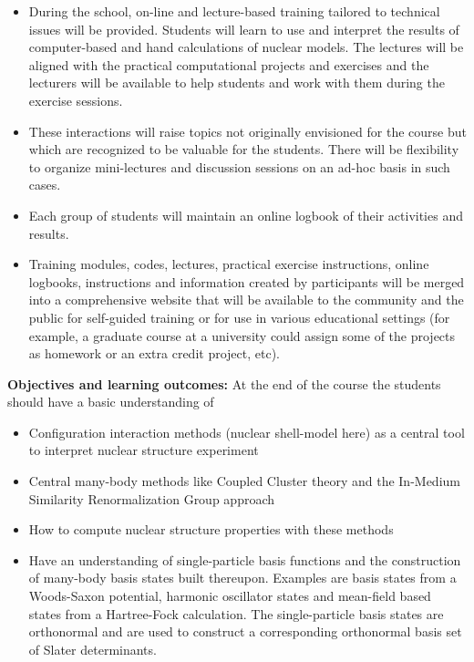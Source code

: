 \documentclass{beamer}
\begin{document}
\begin{frame}
\begin{block}{}
\begin{itemize}
\item During the school, on-line and lecture-based training tailored to technical issues will be provided. Students will learn to use and interpret the results of computer-based and hand calculations of nuclear models. The lectures will be aligned with the practical computational projects and exercises and the lecturers will be available to help students and work with them during the exercise sessions.  

\item These interactions will raise topics not originally envisioned for the course but which are recognized to be valuable for the students. There will be flexibility to organize mini-lectures and discussion sessions on an ad-hoc basis in such cases.  

\item Each group of students will maintain an online logbook of their activities and results.  

\item Training modules, codes, lectures, practical exercise instructions, online logbooks, instructions and information created by participants will be merged into a comprehensive website that will be available to the community and the public for self-guided training or for use in various educational settings (for example, a graduate course at a university could assign some of the projects as homework or an extra credit project, etc).
\end{itemize}

\noindent
\noindent\textbf{Objectives and learning outcomes:}
At the end of the course the students should have a basic understanding of
\begin{itemize}
\item Configuration interaction methods (nuclear shell-model here) as a central tool to interpret nuclear structure experiment

\item Central many-body methods like Coupled Cluster theory and the In-Medium Similarity Renormalization Group approach

\item How to compute nuclear structure properties with these methods 

\item Have an understanding of single-particle basis functions and the construction of many-body basis states built thereupon. Examples are basis states from a Woods-Saxon potential, harmonic oscillator states and mean-field based states from a Hartree-Fock calculation. The single-particle basis states are orthonormal and are used to construct  a corresponding orthonormal basis set of Slater determinants.


\end{itemize}
\end{block}
\end{frame}
\end{document}
